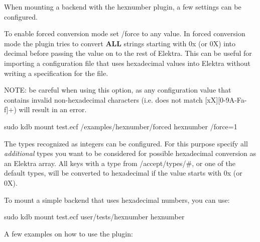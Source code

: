 When mounting a backend with the hexnumber plugin, a few settings can be configured.


\begin{DoxyEnumerate}
\item To enable forced conversion mode set {\ttfamily /force} to any value. In forced conversion mode the plugin tries to convert {\bfseries A\+LL} strings starting with {\ttfamily 0x} (or {\ttfamily 0X}) into decimal before passing the value on to the rest of Elektra. This can be useful for importing a configuration file that uses hexadecimal values into Elektra without writing a specification for the file.

N\+O\+TE\+: be careful when using this option, as any configuration value that contains invalid non-\/hexadecimal characters (i.\+e. does not match {\mbox{[}xX\mbox{]}\mbox{[}0-\/9\+A-\/\+Fa-\/f\mbox{]}+}) will result in an error.
\end{DoxyEnumerate}


\begin{DoxyCode}
sudo kdb mount test.ecf /examples/hexnumber/forced hexnumber /force=1
\end{DoxyCode}



\begin{DoxyEnumerate}
\item The types recognized as integers can be configured. For this purpose specify all {\itshape additional} types you want to be considered for possible hexadecimal conversion as an Elektra array. All keys with a type from {\ttfamily /accept/types/\#}, or one of the default types, will be converted to hexadecimal if the value starts with {\ttfamily 0x} (or {\ttfamily 0X}).
\end{DoxyEnumerate}





\begin{DoxyItemize}
\item To mount a simple backend that uses hexadecimal numbers, you can use\+: 
\begin{DoxyCode}
sudo kdb mount test.ecf user/tests/hexnumber hexnumber
\end{DoxyCode}

\item A few examples on how to use the plugin\+:
\end{DoxyItemize}


